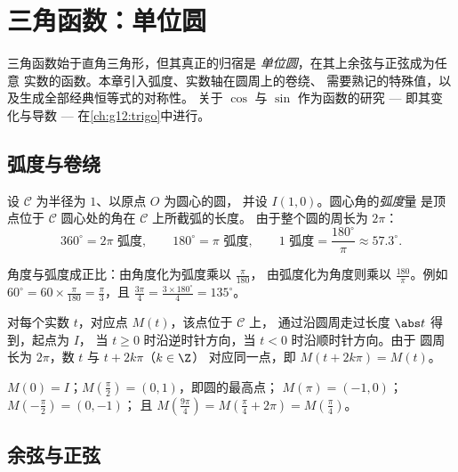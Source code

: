 \chapter{三角函数：单位圆}\label{ch:g11:trigo}

三角函数始于直角三角形，但其真正的归宿是
\emph{单位圆}，在其上余弦与正弦成为任意
实数的函数。本章引入弧度、实数轴在圆周上的卷绕、
需要熟记的特殊值，以及生成全部经典恒等式的对称性。
关于 $\cos$ 与 $\sin$ 作为函数的研究 ---
即其变化与导数 ---
在\cref{ch:g12:trigo}中进行。

\section{弧度与卷绕}

\begin{definition}[弧度]\label{def:g11:trigo:radian}
设 $\mathcal C$ 为半径为 $1$、以原点 $O$ 为圆心的圆，
并设 $I(1, 0)$。圆心角的\emph{弧度}量
是顶点位于 $\mathcal C$ 圆心处的角在 $\mathcal C$ 上所截弧的长度。
由于整个圆的周长为 $2\pi$：
\[
360^\circ = 2\pi \text{ 弧度},
\qquad
180^\circ = \pi \text{ 弧度},
\qquad
1 \text{ 弧度} = \frac{180^\circ}{\pi} \approx 57.3^\circ .
\]
\end{definition}

\begin{method}[换算]\label{met:g11:trigo:convert}
角度与弧度成正比：由角度化为弧度乘以 $\frac{\pi}{180}$，
由弧度化为角度则乘以 $\frac{180}{\pi}$。例如
$60^\circ = 60 \times \frac{\pi}{180} = \frac{\pi}{3}$，且
$\frac{3\pi}{4} = \frac{3 \times 180^\circ}{4} = 135^\circ$。
\end{method}

\begin{definition}[实数轴在圆上的卷绕]\label{def:g11:trigo:winding}
对每个实数 $t$，对应点 $M(t)$，该点位于 $\mathcal C$ 上，
通过沿圆周走过长度 $\abs t$ 得到，起点为 $I$，
当 $t \geq 0$ 时沿逆时针方向，当 $t < 0$ 时沿顺时针方向。由于
圆周长为 $2\pi$，数 $t$ 与 $t + 2k\pi$（$k \in \Z$）
对应同一点，即 $M(t + 2k\pi) = M(t)$。
\end{definition}

\begin{example}
$M(0) = I$；$M\!\left(\frac{\pi}{2}\right) = (0, 1)$，即圆的最高点；
$M(\pi) = (-1, 0)$；$M\!\left(-\frac{\pi}{2}\right) = (0, -1)$；
且 $M\!\left(\frac{9\pi}{4}\right) = M\!\left(\frac{\pi}{4} +
2\pi\right) = M\!\left(\frac{\pi}{4}\right)$。
\end{example}

\section{余弦与正弦}

